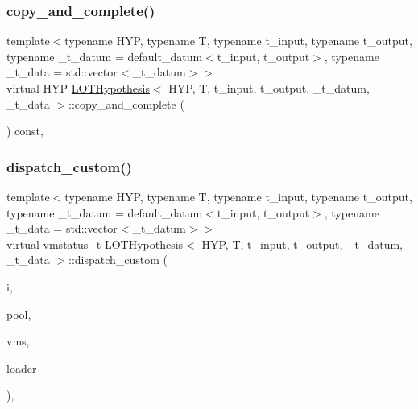 \subsubsection{\texorpdfstring{copy\+\_\+and\+\_\+complete()}{copy\_and\_complete()}}
{\footnotesize\ttfamily template$<$typename H\+YP, typename T, typename t\+\_\+input, typename t\+\_\+output, typename \+\_\+t\+\_\+datum = default\+\_\+datum$<$t\+\_\+input, t\+\_\+output$>$, typename \+\_\+t\+\_\+data = std\+::vector$<$\+\_\+t\+\_\+datum$>$$>$ \\
virtual H\+YP \hyperlink{class_l_o_t_hypothesis}{L\+O\+T\+Hypothesis}$<$ H\+YP, T, t\+\_\+input, t\+\_\+output, \+\_\+t\+\_\+datum, \+\_\+t\+\_\+data $>$\+::copy\+\_\+and\+\_\+complete (\begin{DoxyParamCaption}{ }\end{DoxyParamCaption}) const\hspace{0.3cm}{\ttfamily [inline]}, {\ttfamily [virtual]}}

\mbox{\label{class_l_o_t_hypothesis_a6eae1ce4486971909e0245ab9e30ddeb}} 
\subsubsection{\texorpdfstring{dispatch\+\_\+custom()}{dispatch\_custom()}}
{\footnotesize\ttfamily template$<$typename H\+YP, typename T, typename t\+\_\+input, typename t\+\_\+output, typename \+\_\+t\+\_\+datum = default\+\_\+datum$<$t\+\_\+input, t\+\_\+output$>$, typename \+\_\+t\+\_\+data = std\+::vector$<$\+\_\+t\+\_\+datum$>$$>$ \\
virtual \hyperlink{_instruction_8h_a6202215407ab29590bb936ca2996cf64}{vmstatus\+\_\+t} \hyperlink{class_l_o_t_hypothesis}{L\+O\+T\+Hypothesis}$<$ H\+YP, T, t\+\_\+input, t\+\_\+output, \+\_\+t\+\_\+datum, \+\_\+t\+\_\+data $>$\+::dispatch\+\_\+custom (\begin{DoxyParamCaption}\item[{\hyperlink{class_instruction}{Instruction}}]{i,  }\item[{\hyperlink{class_virtual_machine_pool}{Virtual\+Machine\+Pool}$<$ t\+\_\+input, t\+\_\+output $>$ $\ast$}]{pool,  }\item[{\hyperlink{class_virtual_machine_state}{Virtual\+Machine\+State}$<$ t\+\_\+input, t\+\_\+output $>$ $\ast$}]{vms,  }\item[{\hyperlink{class_dispatchable}{Dispatchable}$<$ t\+\_\+input, t\+\_\+output $>$ $\ast$}]{loader }\end{DoxyParamCaption})\hspace{0.3cm}{\ttfamily [inline]}, {\ttfamily [virtual]}}




